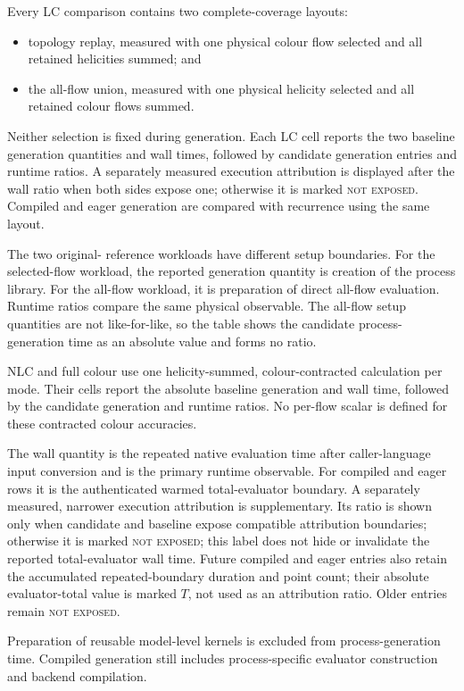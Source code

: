 Every LC comparison contains two complete-coverage layouts:
\begin{itemize}
  \item topology replay, measured with one physical colour flow selected and
        all retained helicities summed; and
  \item the all-flow union, measured with one physical helicity selected and
        all retained colour flows summed.
\end{itemize}
Neither selection is fixed during generation. Each LC cell reports the two
baseline generation quantities and wall times, followed by candidate
generation entries and runtime ratios. A separately measured execution
attribution is displayed after the wall ratio when both sides expose one;
otherwise it is marked \textsc{not exposed}. Compiled and eager generation are
compared with recurrence using the same layout.

The two original-\AC{} reference workloads have different setup boundaries.
For the selected-flow workload, the reported generation quantity is creation
of the process library. For the all-flow workload, it is preparation of direct
all-flow evaluation. Runtime ratios compare the same physical observable. The
all-flow setup quantities are not like-for-like, so the table shows the
candidate process-generation time as an absolute value and forms no ratio.

NLC and full colour use one helicity-summed, colour-contracted calculation per
mode. Their cells report the absolute baseline generation and wall time,
followed by the candidate generation and runtime ratios. No per-flow scalar is
defined for these contracted colour accuracies.

The wall quantity is the repeated native evaluation time after caller-language
input conversion and is the primary runtime observable. For compiled and eager
rows it is the authenticated warmed total-evaluator boundary. A separately
measured, narrower execution attribution is supplementary. Its ratio is shown
only when candidate and baseline expose compatible attribution boundaries;
otherwise it is marked \textsc{not exposed}; this label does not hide or
invalidate the reported total-evaluator wall time. Future compiled and eager
entries also retain the accumulated repeated-boundary duration and point count;
their absolute evaluator-total value is marked \(T\), not used as an
attribution ratio. Older entries remain \textsc{not exposed}.

Preparation of reusable model-level kernels is excluded from
process-generation time. Compiled generation still includes process-specific
evaluator construction and backend compilation.

